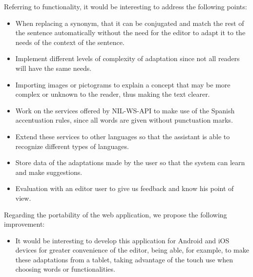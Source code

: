 Referring to functionality, it would be interesting to address the following points:

\begin{itemize}
	\item When replacing a synonym, that it can be conjugated and match the rest of the sentence automatically without the need for the editor to adapt it to the needs of the context of the sentence.
	\item Implement different levels of complexity of adaptation since not all readers will have the same needs.
	\item Importing images or pictograms to explain a concept that may be more complex or unknown to the reader, thus making the text clearer.
	\item Work on the services offered by NIL-WS-API to make use of the Spanish accentuation rules, since all words are given without punctuation marks.
	\item Extend these services to other languages so that the assistant is able to recognize different types of languages.
	
	\item Store data of the adaptations made by the user so that the system can learn and make suggestions.
	\item Evaluation with an editor user to give us feedback and know his point of view.
\end{itemize}	
Regarding the portability of the web application, we propose the following improvement:
\begin{itemize}
	\item It would be interesting to develop this application for Android and iOS devices for greater convenience of the editor, being able, for example, to make these adaptations from a tablet, taking advantage of the touch use when choosing words or functionalities.
	
\end{itemize}
